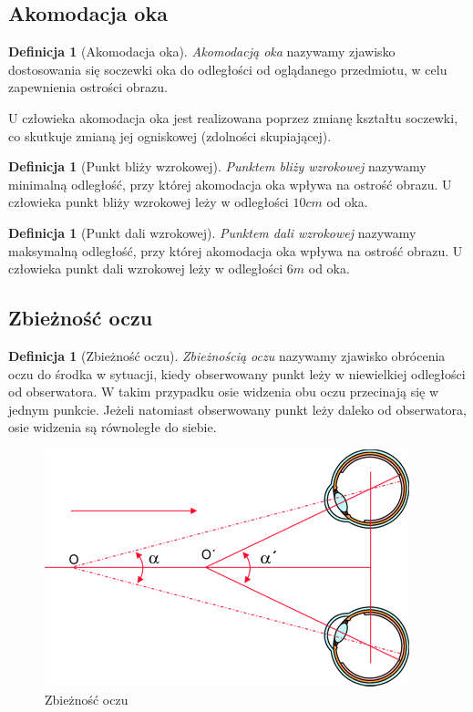 \documentclass[a4paper,11pt,twoside]{report}
\theoremstyle{definition}
\newtheorem{definition}[theorem]{Definicja}
\begin{document}
\subsection{Akomodacja oka}

\begin{definition}[Akomodacja oka]
\textit{Akomodacją oka} nazywamy zjawisko dostosowania się soczewki oka do odległości od oglądanego przedmiotu, w celu zapewnienia ostrości obrazu.
\end{definition}

U człowieka akomodacja oka jest realizowana poprzez zmianę kształtu soczewki, co skutkuje zmianą jej ogniskowej (zdolności skupiającej).

\begin{definition}[Punkt bliży wzrokowej]
\textit{Punktem bliży wzrokowej} nazywamy minimalną odległość, przy której akomodacja oka wpływa na ostrość obrazu. U człowieka punkt bliży wzrokowej leży w odległości $10 cm$ od oka.
\end{definition}

\begin{definition}[Punkt dali wzrokowej]
\textit{Punktem dali wzrokowej} nazywamy maksymalną odległość, przy której akomodacja oka wpływa na ostrość obrazu. U człowieka punkt dali wzrokowej leży w odległości $6 m$ od oka.
\end{definition}

\subsection{Zbieżność oczu}

\begin{definition}[Zbieżność oczu]
\textit{Zbieżnością oczu} nazywamy zjawisko obrócenia oczu do środka w sytuacji, kiedy obserwowany punkt leży w niewielkiej odległości od obserwatora. W takim przypadku osie widzenia obu oczu przecinają się w jednym punkcie. Jeżeli natomiast obserwowany punkt leży daleko od obserwatora, osie widzenia są równoległe do siebie.
\end{definition}

\begin{figure}[h]
\centering
\includegraphics[scale=0.5]{images/zbieznosc}
\caption[Zbieżność oczu (źródło: http://www.swiatlo.tak.pl/1/index.php/funkcje-wzroku-akomodacja-adaptacja-zbieznosc/)]{Zbieżność oczu}
\end{figure}
\end{document}
